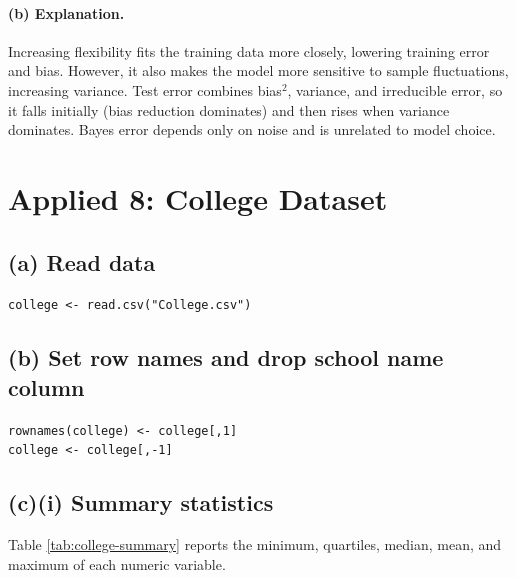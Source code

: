 \documentclass{article}
\begin{document}
\paragraph{(b) Explanation.}
Increasing flexibility fits the training data more closely, lowering training error and bias.
However, it also makes the model more sensitive to sample fluctuations, increasing variance.
Test error combines bias$^2$, variance, and irreducible error, so it falls initially (bias reduction dominates)
and then rises when variance dominates. Bayes error depends only on noise and is unrelated to model choice.

\section{Applied 8: College Dataset}
\subsection*{(a) Read data}
\texttt{college <- read.csv("College.csv")}

\subsection*{(b) Set row names and drop school name column}
\texttt{rownames(college) <- college[,1]} \\
\texttt{college <- college[,-1]}

\subsection*{(c)(i) Summary statistics}
Table \ref{tab:college-summary} reports the minimum, quartiles, median, mean, and maximum of each numeric variable.
\end{document}
